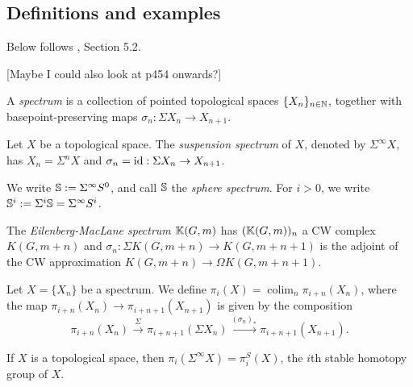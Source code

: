 \documentclass{MetricNotes2023}
\def\bb{\ensuremath\mathbb}
\def\nat{\ensuremath\mathbb{N}}
\def\id{\ensuremath\text{id}}
\DeclareMathOperator{\colim}{colim}
\begin{document}
\subsection{Definitions and examples}

Below follows \autocite{hatcher5}, Section 
5.2.

[Maybe I could also look at \autocite{hatcher} p454 onwards?]

\begin{definition}
A \textit{spectrum} is a collection of pointed topological spaces \(\{X_n\}_{n\in \nat}\), together with basepoint-preserving maps \(\sigma_n : \Sigma X_n \to X_{n+1}\).
\end{definition}

\begin{example}
Let \(X\) be a topological space. The \textit{suspension spectrum} of \(X\), denoted by \(\Sigma^\infty X\), has \(X_n=\Sigma^nX\) and \(\sigma_n=\id : \Sigma X_n \to X_{n+1}\).
\end{example}

We write \(\bb{S}:=\Sigma^\infty S^0\), and call \(\bb{S}\) the \textit{sphere spectrum}. For \(i>0\), we write \(\bb{S}^i:=\Sigma^i \bb{S}=\Sigma^\infty S^i\).

\begin{example}
The \textit{Eilenberg-MacLane spectrum} \(\bb{K}(G,m)\) has \((\bb{K}(G,m))_n\) a CW complex \(K(G,m+n)\) and \(\sigma_n : \Sigma K(G,m+n)\to K(G,m+n+1)\) is the adjoint of the CW approximation \(K(G, m+n)\to \Omega K(G,m+n+1)\).
\end{example}



\begin{definition}
Let \(X=\{X_n\}\) be a spectrum. We define \(\pi_i(X)=\colim_n \pi_{i+n}(X_n)\), where the map \(\pi_{i+n}(X_n)\to \pi_{i+n+1}(X_{n+1})\) is given by the composition
\[\pi_{i+n}(X_n)\xrightarrow{\Sigma}\pi_{i+n+1}(\Sigma X_n)\xrightarrow{(\sigma_n)_*}\pi_{i+n+1}(X_{n+1}).\]
\end{definition}

\begin{example}
If \(X\) is a topological space, then \(\pi_i(\Sigma^\infty X)=\pi_i^S(X)\), the \(i\)th stable homotopy group of \(X\). 
\end{example}
\end{document}
